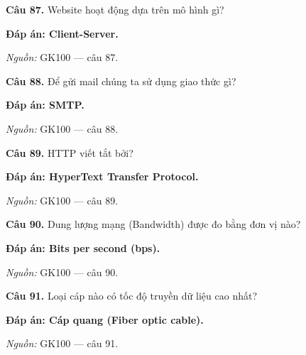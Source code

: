 \documentclass[11pt,a4paper]{article}
\begin{document}
\textbf{Câu 87.} Website hoạt động dựa trên mô hình gì?\par
{\color{answer}\textbf{Đáp án: Client-Server.}}\par
{\footnotesize\color{sourcegray}\textit{Nguồn:} GK100 — câu 87.\par}
\vspace{3pt}\par\noindent{\color{black!18}\rule{\linewidth}{0.3pt}}\par\medskip

\textbf{Câu 88.} Để gửi mail chúng ta sử dụng giao thức gì?\par
{\color{answer}\textbf{Đáp án: SMTP.}}\par
{\footnotesize\color{sourcegray}\textit{Nguồn:} GK100 — câu 88.\par}
\vspace{3pt}\par\noindent{\color{black!18}\rule{\linewidth}{0.3pt}}\par\medskip

\textbf{Câu 89.} HTTP viết tắt bởi?\par
{\color{answer}\textbf{Đáp án: HyperText Transfer Protocol.}}\par
{\footnotesize\color{sourcegray}\textit{Nguồn:} GK100 — câu 89.\par}
\vspace{3pt}\par\noindent{\color{black!18}\rule{\linewidth}{0.3pt}}\par\medskip

\textbf{Câu 90.} Dung lượng mạng (Bandwidth) được đo bằng đơn vị nào?\par
{\color{answer}\textbf{Đáp án: Bits per second (bps).}}\par
{\footnotesize\color{sourcegray}\textit{Nguồn:} GK100 — câu 90.\par}
\vspace{3pt}\par\noindent{\color{black!18}\rule{\linewidth}{0.3pt}}\par\medskip

\textbf{Câu 91.} Loại cáp nào có tốc độ truyền dữ liệu cao nhất?\par
{\color{answer}\textbf{Đáp án: Cáp quang (Fiber optic cable).}}\par
{\footnotesize\color{sourcegray}\textit{Nguồn:} GK100 — câu 91.\par}
\vspace{3pt}\par\noindent{\color{black!18}\rule{\linewidth}{0.3pt}}\par\medskip
\end{document}
